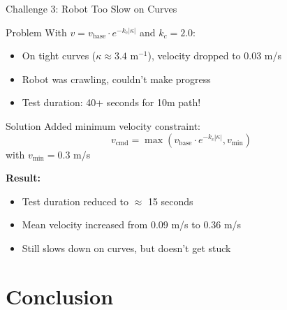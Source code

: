 \documentclass[10pt]{beamer}
\begin{document}
\begin{frame}{Challenge 3: Robot Too Slow on Curves}
  \begin{alertblock}{Problem}
    With $v = v_{\text{base}} \cdot e^{-k_c |\kappa|}$ and $k_c = 2.0$:
    \begin{itemize}
      \item On tight curves ($\kappa \approx 3.4$ m$^{-1}$), velocity dropped to 0.03 m/s
      \item Robot was crawling, couldn't make progress
      \item Test duration: 40+ seconds for 10m path!
    \end{itemize}
  \end{alertblock}

  \begin{block}{Solution}
    Added minimum velocity constraint:
    $$v_{\text{cmd}} = \max(v_{\text{base}} \cdot e^{-k_c |\kappa|}, v_{\min})$$
    with $v_{\min} = 0.3$ m/s
  \end{block}

  \textbf{Result:}
  \begin{itemize}
    \item Test duration reduced to $\approx$ 15 seconds
    \item Mean velocity increased from 0.09 m/s to 0.36 m/s
    \item Still slows down on curves, but doesn't get stuck
  \end{itemize}
\end{frame}

\section{Conclusion}
\end{document}
